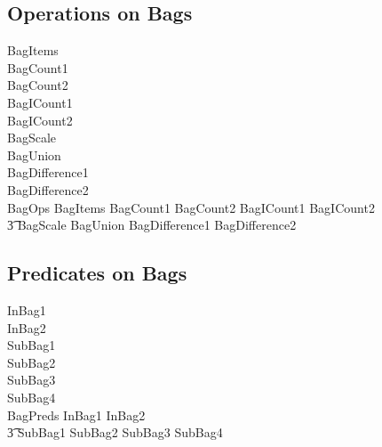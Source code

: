 \documentclass{article}
\begin{document}
\subsection{Operations on Bags}
\begin{zed}
  BagItems \\
  BagCount1 \\
  BagCount2 \\
  BagICount1 \\
  BagICount2 \\
  BagScale \\
  BagUnion \\
  BagDifference1 \\
  BagDifference2 \\
  \also
  BagOps  BagItems \land BagCount1 \land BagCount2 \land BagICount1 \land BagICount2 \land \\
  \t3 BagScale \land BagUnion \land BagDifference1 \land BagDifference2 \\
\end{zed}

\subsection{Predicates on Bags}
\begin{zed}
  InBag1 \\
  InBag2 \\
  SubBag1 \\
  SubBag2 \\
  SubBag3 \\
  SubBag4 \\
  \also
  BagPreds  InBag1 \land InBag2 \land \\
  \t3 SubBag1 \land SubBag2 \land SubBag3 \land SubBag4\\
\end{zed}
\end{document}
